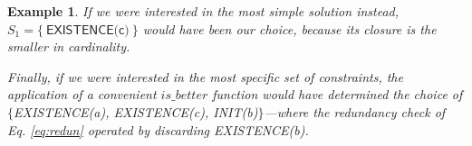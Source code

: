 \documentclass[a4wide,11pt]{article}
\newcommand{\tcolor}[2]{\color{#1}{#2}\color{black}}
\theoremstyle{definition}
\theoremstyle{plain}
\newtheorem{example}{Example}[section]
\begin{document}
\begin{example}
If we were interested in the most simple solution instead, $S_1=\{\ \textsf{EXISTENCE(c)}\ \}$ would have been our choice, because its closure is the smaller in cardinality.

Finally, if we were interested in the most specific set of constraints, the application of a convenient ${is\_better}$ function would have determined the choice of $\{$\textsf{EXISTENCE(a), EXISTENCE(c), INIT(b)}$\}$---where the redundancy check of Eq. \eqref{eq:redun} operated by discarding \textsf{EXISTENCE(b)}. 
\end{example}

%
%

%

%


%
%
%
%
\end{document}
